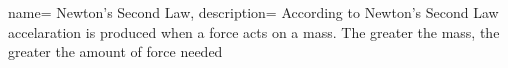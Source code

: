 {
    name= Newton's Second Law,
    description={ According to Newton's Second Law accelaration is produced when a force acts on a mass. The greater the mass, the greater the amount of force needed}
} 
